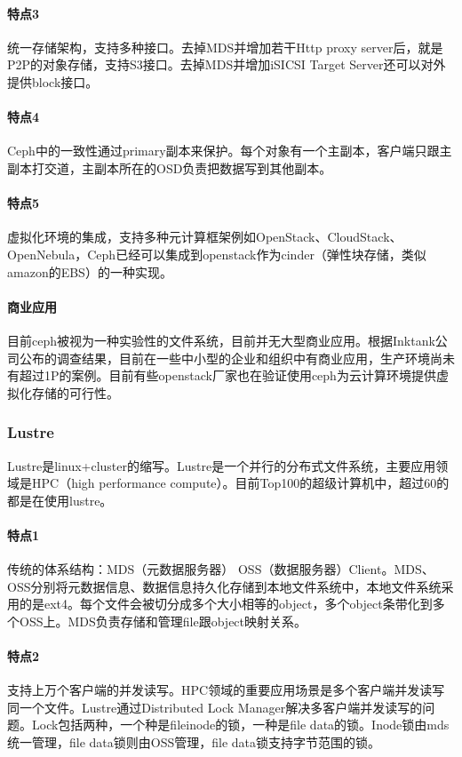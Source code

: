 \documentclass[UTF8]{ctexart}
\begin{document}
\paragraph{特点3}
统一存储架构，支持多种接口。去掉MDS并增加若干Http proxy server后，就是P2P的对象存储，支持S3接口。去掉MDS并增加iSICSI Target Server还可以对外提供block接口。
\paragraph{特点4}
Ceph中的一致性通过primary副本来保护。每个对象有一个主副本，客户端只跟主副本打交道，主副本所在的OSD负责把数据写到其他副本。
\paragraph{特点5}
虚拟化环境的集成，支持多种元计算框架例如OpenStack、CloudStack、OpenNebula，Ceph已经可以集成到openstack作为cinder（弹性块存储，类似amazon的EBS）的一种实现。
\paragraph{商业应用}
目前ceph被视为一种实验性的文件系统，目前并无大型商业应用。根据Inktank公司公布的调查结果，目前在一些中小型的企业和组织中有商业应用，生产环境尚未有超过1P的案例。目前有些openstack厂家也在验证使用ceph为云计算环境提供虚拟化存储的可行性。

\subsubsection{Lustre}
Lustre是linux+cluster的缩写。Lustre是一个并行的分布式文件系统，主要应用领域是HPC（high performance compute）。目前Top100的超级计算机中，超过60的都是在使用lustre。
\paragraph{特点1}
传统的体系结构：MDS（元数据服务器） OSS（数据服务器）Client。MDS、OSS分别将元数据信息、数据信息持久化存储到本地文件系统中，本地文件系统采用的是ext4。每个文件会被切分成多个大小相等的object，多个object条带化到多个OSS上。MDS负责存储和管理file跟object映射关系。
\paragraph{特点2}
支持上万个客户端的并发读写。HPC领域的重要应用场景是多个客户端并发读写同一个文件。Lustre通过Distributed Lock Manager解决多客户端并发读写的问题。Lock包括两种，一个种是fileinode的锁，一种是file data的锁。Inode锁由mds统一管理，file data锁则由OSS管理，file data锁支持字节范围的锁。
\end{document}
